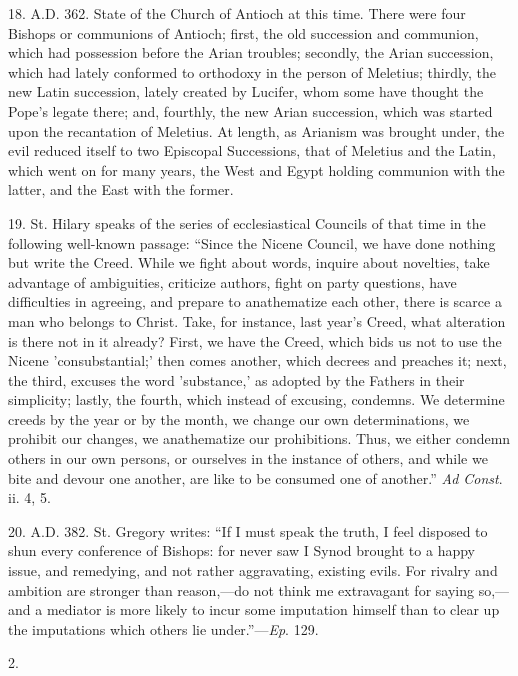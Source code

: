 18. A.D. 362. State of the Church of Antioch
at this time. There were four Bishops or communions of Antioch; first,
the old succession and communion, which had possession before the
Arian troubles; secondly, the Arian succession, which had lately
conformed to orthodoxy in the person of Meletius; thirdly, the new
Latin succession, lately created by Lucifer, whom some have thought
the Pope's legate there; and, fourthly, the new Arian succession,
which was started upon the recantation of Meletius. At length, as
Arianism was brought under, the evil reduced itself to two Episcopal
Successions, that of Meletius and the Latin, which went on for many
years, the West and Egypt holding communion with the latter, and the
East with the former.

19. St. Hilary speaks of the series of ecclesiastical Councils of
that time in the following well-known passage: ``Since the Nicene
Council, we have done nothing but write the Creed. While we fight
about words, inquire about novelties, take advantage of ambiguities,
criticize authors, fight on party questions, have difficulties in
agreeing, and prepare to anathematize each other, there is scarce a
man who belongs to Christ. Take, for instance, last year's
Creed, what alteration is there not in it already? First, we have the
Creed, which bids us not to use the Nicene 'consubstantial;' then
comes another, which decrees and preaches it; next, the third, excuses
the word 'substance,' as adopted by the Fathers in their simplicity;
lastly, the fourth, which instead of excusing, condemns. We determine
creeds by the year or by the month, we change our own determinations,
we prohibit our changes, we anathematize our prohibitions. Thus, we
either condemn others in our own persons, or ourselves in the instance
of others, and while we bite and devour one another, are like to be
consumed one of another.'' \emph{Ad Const}. ii. 4, 5.

20. A.D. 382. St. Gregory writes: ``If I
must speak the truth, I feel disposed to shun every conference of
Bishops: for never saw I Synod brought to a happy issue, and
remedying, and not rather aggravating, existing evils. For rivalry and
ambition are stronger than reason,—do not think me extravagant for
saying so,—and a mediator is more likely to incur some imputation
himself than to clear up the imputations which others lie under.''—\emph{Ep}.
129.

2.

